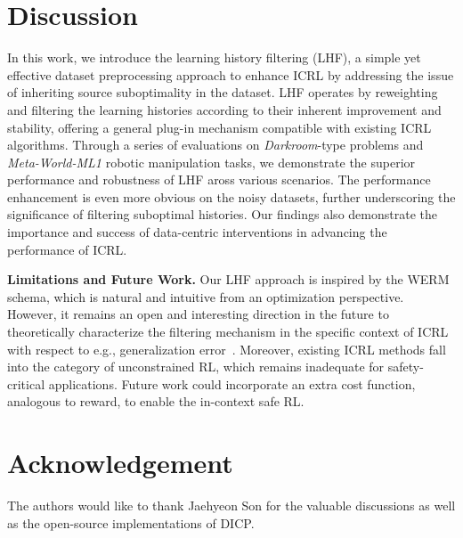 \documentclass{article}
\begin{document}
\section{Discussion}
\label{discussion_section}
%
In this work, we introduce the learning history filtering (LHF), a simple yet effective dataset preprocessing approach to enhance ICRL by addressing the issue of inheriting source suboptimality in the dataset. LHF operates by reweighting and filtering the learning histories according to their inherent improvement and stability, offering a general plug-in mechanism compatible with existing ICRL algorithms.
%
Through a series of evaluations on \textit{Darkroom}-type problems and \textit{Meta-World-ML1} robotic manipulation tasks, we demonstrate the superior performance and robustness of LHF aross various scenarios. The performance enhancement is even more obvious on the noisy datasets, further underscoring the significance of filtering suboptimal histories.
%
Our findings also demonstrate the importance and success of data-centric interventions in advancing the performance of ICRL.




\textbf{Limitations and Future Work.}
%
Our LHF approach is inspired by the WERM schema, which is natural and intuitive from an optimization perspective. However, it remains an open and interesting direction in the future to theoretically characterize the filtering mechanism in the specific context of ICRL with respect to e.g., generalization error~\cite{lin2023transformers}.
%
Moreover, existing ICRL methods fall into the category of unconstrained RL, which remains inadequate for safety-critical applications. Future work could incorporate an extra cost function, analogous to reward, to enable the in-context safe RL.












\clearpage


\section*{Acknowledgement}
%
The authors would like to thank Jaehyeon Son for the valuable discussions as well as the open-source implementations of DICP.
\end{document}

